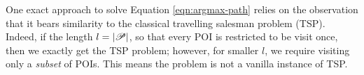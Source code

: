 



One exact approach to solve Equation \ref{eqn:argmax-path}
relies on the observation that
it bears similarity to the classical travelling salesman problem (TSP).
Indeed, if the length $l = |\mathscr{P}|$, so that every POI is restricted to be visit once,
then we exactly get the TSP problem;
however, for smaller $l$, we require visiting only a \emph{subset} of POIs.
This means the problem is not a vanilla instance of TSP.

